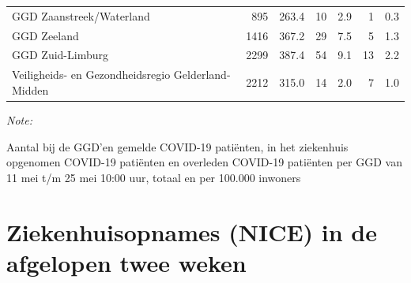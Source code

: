 \documentclass[
  english,
  man,floatsintext]{apa6}
\begin{document}
\begin{table}
\begin{threeparttable}
\begin{tabular}{lrrrrrr}
GGD Zaanstreek/Waterland & 895 & 263.4 & 10 & 2.9 & 1 & 0.3\\
GGD Zeeland & 1416 & 367.2 & 29 & 7.5 & 5 & 1.3\\
GGD Zuid-Limburg & 2299 & 387.4 & 54 & 9.1 & 13 & 2.2\\
Veiligheids- en Gezondheidsregio Gelderland-Midden & 2212 & 315.0 & 14 & 2.0 & 7 & 1.0\\
\bottomrule
\end{tabular}
\begin{tablenotes}
\item \textit{Note: } 
\item Aantal bij de GGD’en gemelde COVID-19 patiënten, in het ziekenhuis opgenomen COVID-19 patiënten en overleden COVID-19 patiënten per GGD van 11 mei t/m 25 mei 10:00 uur, totaal en per 100.000 inwoners
\end{tablenotes}
\end{threeparttable}
\endgroup{}
\end{table}

\newpage

\hypertarget{ziekenhuisopnames-nice-in-de-afgelopen-twee-weken}{%
\section{Ziekenhuisopnames (NICE) in de afgelopen twee weken}\label{ziekenhuisopnames-nice-in-de-afgelopen-twee-weken}}
\end{document}
